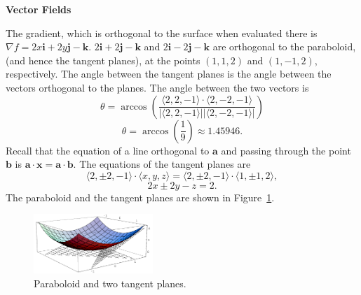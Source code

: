 \begin{large}
  \noindent
  \textbf{Vector Fields}
\end{large}




\begin{Solution}
  \label{solution paraboloid x2 + y2 - z}
  The gradient, which is orthogonal to the surface when evaluated there is
  $\nabla f = 2x \mathbf{i} + 2 y \mathbf{j} - \mathbf{k}$.  
  $2 \mathbf{i} + 2 \mathbf{j} - \mathbf{k}$ and $2 \mathbf{i} - 2 \mathbf{j} - \mathbf{k}$ are
  orthogonal to the paraboloid, (and hence the tangent planes), at the points 
  $(1,1,2)$ and $(1,-1,2)$, respectively.  The angle between the tangent
  planes is the angle between the vectors orthogonal to the planes.  The 
  angle between the two vectors is
  \[
  \theta = \arccos \left( \frac{ \langle 2,2,-1 \rangle \cdot \langle 2,-2,-1 \rangle }
    { | \langle 2,2,-1 \rangle | | \langle 2,-2,-1 \rangle | } \right)
  \]
  \[
  \boxed{
    \theta = \arccos \left( \frac{1}{9} \right)
    \approx 1.45946.
    }
  \]
  Recall that the equation of a line orthogonal to $\mathbf{a}$ and passing 
  through the point $\mathbf{b}$ is $\mathbf{a} \cdot \mathbf{x} = \mathbf{a} \cdot \mathbf{b}$.
  The equations of the tangent planes are
  \[
  \langle 2,\pm 2,-1 \rangle \cdot \langle x,y,z \rangle 
  = \langle 2,\pm 2,-1 \rangle \cdot \langle 1,\pm 1,2 \rangle,
  \]
  \[
  \boxed{
    2 x \pm 2 y - z = 2.
    }
  \]
  The paraboloid and the tangent planes are shown in Figure~\ref{paratp}.

  \begin{figure}[h!]
    \begin{center}
      \includegraphics[width=0.4\textwidth]{calculus/vector/paratp}
    \end{center}
    \caption{Paraboloid and two tangent planes.}
    \label{paratp}
  \end{figure}
\end{Solution}








